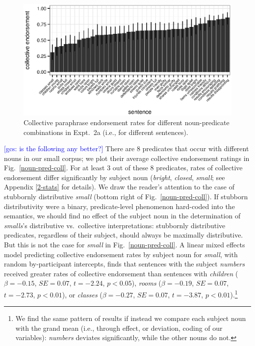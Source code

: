 \documentclass[linguex]{sp}
\newcommand{\ndg}[1]{\textcolor{Green}{[ndg: #1]}}
\newcommand{\gcs}[1]{\textcolor{blue}{[gcs: #1]}}
\begin{document}
\begin{figure}[h!]
	\centering
	\includegraphics[width=.985\linewidth]{plots/sentence_plot2.eps}
	\caption{Collective paraphrase endorsement rates for different noun-predicate combinations in Expt.~2a (i.e., for different sentences).} \label{sentence-coll}
\end{figure}

\gcs{is the following any better?}
There are 8 predicates that occur with different nouns in our small corpus; we plot their average collective endorsement ratings in Fig.~\ref{noun-pred-coll}.
%
%
For at least 3 out of these 8 predicates, rates of collective endorsement differ significantly by subject noun (\emph{bright}, \emph{closed}, \emph{small}; see Appendix \ref{2-stats} for details). We draw the reader's attention to the case of stubbornly distributive \emph{small} (bottom right of Fig.~\ref{noun-pred-coll}). 
If stubborn distributivity were a binary, predicate-level phenomenon hard-coded into the semantics, we should find no effect of the subject noun in the determination of \emph{smalls}'s distributive vs.~collective interpretations: stubbornly distributive predicates, regardless of their subject, should always be maximally distributive. But this is not the case for \emph{small} in Fig.~\ref{noun-pred-coll}. 
A linear mixed effects model predicting collective endorsement rates by subject noun for \emph{small}, with random by-participant intercepts, finds that sentences with the subject \emph{numbers} received greater rates of collective endorsement than sentences with \emph{children} ($\beta=-0.15$, $SE=0.07$, $t=-2.24$, $p<0.05$), \emph{rooms} ($\beta=-0.19$, $SE=0.07$, $t=-2.73$, $p<0.01$), or \emph{classes} ($\beta=-0.27$, $SE=0.07$, $t=-3.87$, $p<0.01$).\footnote{We find the same pattern of results if instead we compare each subject noun with the grand mean (i.e., through effect, or deviation, coding of our variables): \emph{numbers} deviates significantly, while the other nouns do not.}
\end{document}
